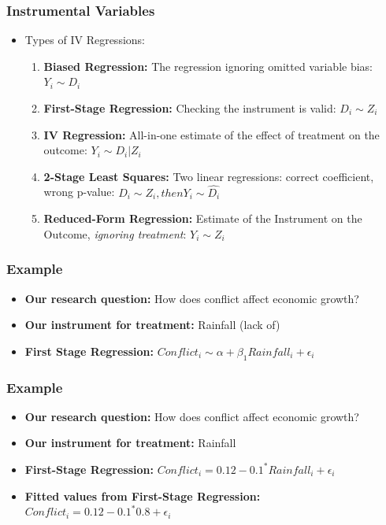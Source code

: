 \documentclass[xcolor=x11names,compress]{beamer}\usepackage[]{graphicx}\usepackage[]{color}
\renewcommand{\(}{\begin{columns}}
\renewcommand{\)}{\end{columns}}
\newcommand{\<}[1]{\begin{column}{#1}}
\renewcommand{\>}{\end{column}}
\begin{document}
\begin{frame}
\frametitle{Instrumental Variables}
\begin{itemize}
\item Types of IV Regressions:
\pause
\begin{enumerate}
\item \textbf{Biased Regression:} The regression ignoring omitted variable bias: $Y_i \sim D_i$
\pause
\item \textbf{First-Stage Regression:} Checking the instrument is valid: $D_i \sim Z_i$
\pause
\item \textbf{IV Regression:} All-in-one estimate of the effect of treatment on the outcome: $Y_i \sim D_i | Z_i$
\pause
\item \textbf{2-Stage Least Squares:} Two linear regressions: correct coefficient, wrong p-value: $D_i \sim Z_i, then Y_i \sim \hat{D_i}$
\pause
\item \textbf{Reduced-Form Regression:} Estimate of the Instrument on the Outcome, \textit{ignoring treatment}: $Y_i \sim Z_i$
\end{enumerate}
\end{itemize}
\end{frame}

\begin{frame}
\frametitle{Example}
\begin{itemize}
\item \textbf{Our research question:} How does conflict affect economic growth?
\pause
\item \textbf{Our instrument for treatment:} Rainfall (lack of)
\pause
\item \textbf{First Stage Regression:} $Conflict_i \sim \alpha + \beta_1 Rainfall_i + \epsilon_i$
\end{itemize}
\end{frame}

\begin{frame}
\frametitle{Example}
\begin{itemize}
\item \textbf{Our research question:} How does conflict affect economic growth?
\item \textbf{Our instrument for treatment:} Rainfall
\item \textbf{First-Stage Regression:} $Conflict_i = 0.12 - 0.1^{*} Rainfall_i + \epsilon_i$
\pause
\item \textbf{Fitted values from First-Stage Regression:} $\hat{Conflict_i} = 0.12 - 0.1^{*} 0.8 + \epsilon_i$
\end{itemize}
\end{frame}
\end{document}
